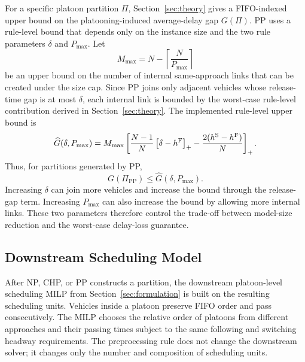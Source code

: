 For a specific platoon partition \(\Pi\), Section~\ref{sec:theory} gives a FIFO-indexed upper bound on the platooning-induced average-delay gap \(G(\Pi)\). PP uses a rule-level bound that depends only on the instance size and the two rule parameters \(\delta\) and \(P_{\max}\). Let
\begin{equation}
M_{\max}=N-\left\lceil\frac{N}{P_{\max}}\right\rceil
\end{equation}
be an upper bound on the number of internal same-approach links that can be created under the size cap. Since PP joins only adjacent vehicles whose release-time gap is at most \(\delta\), each internal link is bounded by the worst-case rule-level contribution derived in Section~\ref{sec:theory}. The implemented rule-level upper bound is
\begin{equation}
\widehat G(\delta,P_{\max})
=
M_{\max}
\left[
\frac{N-1}{N}\left[\delta-h^{\mathrm{F}}\right]_{+}
-\frac{2(h^{\mathrm{S}}-h^{\mathrm{F}})}{N}
\right]_+ .
\label{eq:rule-level-bound-method}
\end{equation}
Thus, for partitions generated by PP,
\begin{equation}
G(\Pi_{\mathrm{PP}})\le \widehat G(\delta,P_{\max}).
\end{equation}
Increasing \(\delta\) can join more vehicles and increase the bound through the release-gap term. Increasing \(P_{\max}\) can also increase the bound by allowing more internal links. These two parameters therefore control the trade-off between model-size reduction and the worst-case delay-loss guarantee.

\subsection{Downstream Scheduling Model}
\label{sec:downstream-after-pp}


After NP, CHP, or PP constructs a partition, the downstream platoon-level scheduling MILP from Section~\ref{sec:formulation} is built on the resulting scheduling units. Vehicles inside a platoon preserve FIFO order and pass consecutively. The MILP chooses the relative order of platoons from different approaches and their passing times subject to the same following and switching headway requirements. The preprocessing rule does not change the downstream solver; it changes only the number and composition of scheduling units.

